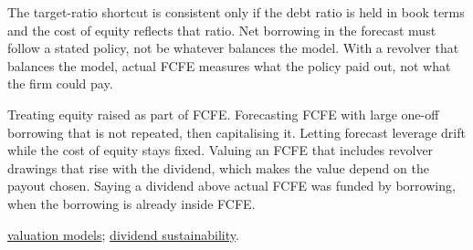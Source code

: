 \begin{qfmethod}
 The target-ratio shortcut is consistent only if the debt ratio is held in book terms and the cost of equity reflects that ratio. Net borrowing in the forecast must follow a stated policy, not be whatever balances the model. With a revolver that balances the model, actual FCFE measures what the policy paid out, not what the firm could pay.

 Treating equity raised as part of FCFE. Forecasting FCFE with large one-off borrowing that is not repeated, then capitalising it. Letting forecast leverage drift while the cost of equity stays fixed. Valuing an FCFE that includes revolver drawings that rise with the dividend, which makes the value depend on the payout chosen. Saying a dividend above actual FCFE was funded by borrowing, when the borrowing is already inside FCFE.

 \hyperref[meth:fcf-valuation-models]{valuation models}; \hyperref[meth:dividend-sustainability]{dividend sustainability}.

\end{qfmethod}

